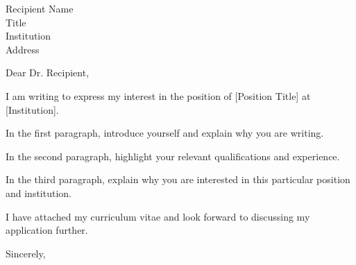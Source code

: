 \documentclass[11pt]{letter}
\begin{document}
\begin{letter}{Recipient Name \\
  Title \\
  Institution \\
  Address}

\opening{Dear Dr. Recipient,}

I am writing to express my interest in the position of
[Position Title] at [Institution].

In the first paragraph, introduce yourself and explain
why you are writing.

In the second paragraph, highlight your relevant
qualifications and experience.

In the third paragraph, explain why you are interested
in this particular position and institution.

I have attached my curriculum vitae and look forward
to discussing my application further.

\closing{Sincerely,}

\end{letter}
\end{document}
